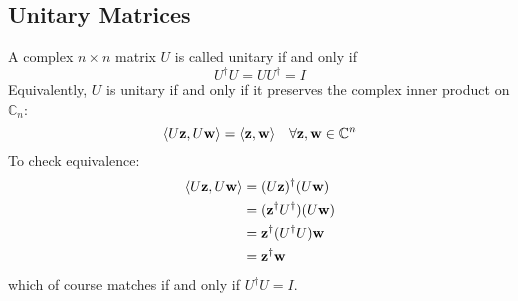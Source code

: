 \subsection{Unitary Matrices}
A complex \(n \times n\) matrix \(U\) is called unitary if and only if
\[ U^\dagger U = U U^\dagger = I \]
Equivalently, \(U\) is unitary if and only if it preserves the complex inner product on \(\mathbb C_n\):
\[ \langle U \vb z, U \vb w \rangle = \langle \vb z, \vb w \rangle\quad \forall \vb z, \vb w \in \mathbb C^n \]
To check equivalence:
\begin{align*}
	\langle U \vb z, U \vb w \rangle & = (U \vb z)^\dagger (U \vb w)         \\
	                                 & = (\vb z^\dagger U^\dagger) (U \vb w) \\
	                                 & = \vb z^\dagger (U^\dagger U) \vb w   \\
	                                 & = \vb z^\dagger \vb w
\end{align*}
which of course matches if and only if \(U^\dagger U = I\).
